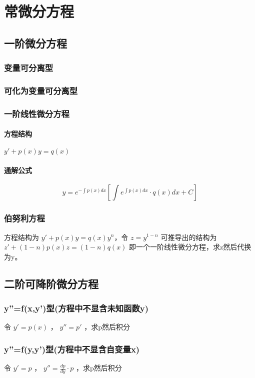 ﻿\documentclass[a4paper,12pt,UTF8]{ctexart}
\begin{document}
    \section{常微分方程}
    
    \subsection{一阶微分方程}

    \subsubsection{变量可分离型}

    \subsubsection{可化为变量可分离型}

    \subsubsection{一阶线性微分方程}
    \paragraph{方程结构}\(y'+p(x)y=q(x)\)
    \paragraph{通解公式}
    \[y=e^{-\int p(x)dx}\left[\int e^{\int p(x)dx} \cdot q(x)dx+C\right]\]

    \subsubsection{伯努利方程}
    方程结构为 \(y'+p(x)y=q(x)y^{n}\)，令 \(z=y^{1-n}\) 可推导出的结构为 \(z'+(1-n)p(x)z=(1-n)q(x)\) 即一个一阶线性微分方程，求z然后代换为y。
    
    \subsection{二阶可降阶微分方程}
    
    \subsubsection{y''=f(x,y')型(方程中不显含未知函数y)}
    令 \(y'=p(x)\) ， \(y''=p'\) ，求p然后积分 
    
    \subsubsection{y''=f(y,y')型(方程中不显含自变量x)}
    令 \(y'=p\) ， \(y''=\frac{dp}{dy} \cdot p\) ，求p然后积分  
    
\end{document}
